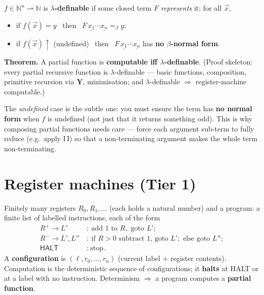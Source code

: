 \documentclass[11pt,a4paper]{article}
\newcommand{\cn}[1]{\underline{#1}}     %
\newcommand{\beq}{=_\beta}
\begin{document}
\begin{must}
$f\in\mathbb N^n\rightharpoonup\mathbb N$ is \textbf{$\lambda$-definable} if some closed term $F$ \emph{represents} it: for all $\vec x$,
\begin{itemize}[leftmargin=*,itemsep=0pt]
  \item if $f(\vec x)=y$ \ then \ $F\,\cn{x_1}\cdots\cn{x_n}\beq\cn y$;
  \item if $f(\vec x){\uparrow}$ (undefined) \ then \ $F\,\cn{x_1}\cdots\cn{x_n}$ has \textbf{no $\beta$-normal form}.
\end{itemize}
\textbf{Theorem.} A partial function is \textbf{computable iff $\lambda$-definable}. (Proof skeleton: every partial recursive function is $\lambda$-definable --- basic functions, composition, primitive recursion via $\mathbf Y$, minimisation; and $\lambda$-definable $\Rightarrow$ register-machine computable.)
\end{must}

\begin{gotcha}
The \emph{undefined} case is the subtle one: you must ensure the term has \textbf{no normal form} when $f$ is undefined (not just that it returns something odd). This is why composing partial functions needs care --- force each argument sub-term to fully reduce (e.g.\ apply $\mathrm I\,\mathrm I$) so that a non-terminating argument makes the whole term non-terminating.
\end{gotcha}

\section{Register machines (Tier 1)}

\begin{must}[title=Definition]
Finitely many registers $R_0,R_1,\dots$ (each holds a natural number) and a program: a finite list of labelled instructions, each of the form
\[
\begin{aligned}
R^{+}\to L' \ &: \ \text{add 1 to }R,\text{ goto }L';\\
R^{-}\to L',L'' \ &: \ \text{if }R{>}0\text{ subtract 1, goto }L';\text{ else goto }L'';\\
\textsf{HALT} \ &: \ \text{stop.}
\end{aligned}
\]
A \textbf{configuration} is $(\ell,r_0,\dots,r_n)$ (current label $+$ register contents). Computation is the deterministic sequence of configurations; it \textbf{halts} at \textsf{HALT} or at a label with no instruction. Determinism $\Rightarrow$ a program computes a \textbf{partial function}.
\end{must}
\end{document}
